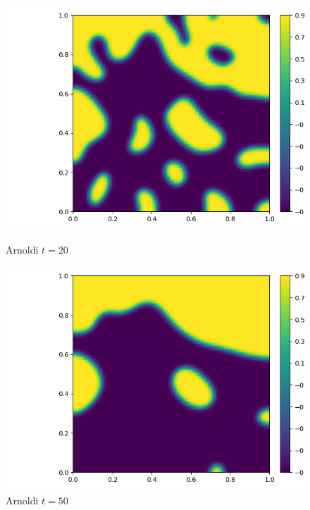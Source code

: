 \documentclass{article}
\begin{document}
\begin{figure}[H]
    \centering
    \begin{minipage}{0.5\textwidth}
       \centering
	  \includegraphics[width=\linewidth]{FEPics/Allen Cahn Test2_60x60_0.025_EXPARN_EndTime=20.png}
	  \caption{Arnoldi $t=20$}
    \end{minipage}\hfill
    \begin{minipage}{0.5\textwidth}
       \centering
	  \includegraphics[width=\linewidth]{FEPics/Allen Cahn Test2_60x60_0.025_EXPARN_EndTime=50.png}
	  \caption{Arnoldi $t=50$}
    \end{minipage}
\end{figure}
\end{document}
